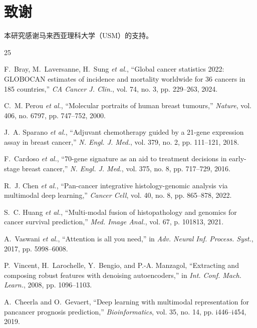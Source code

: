 \documentclass[conference]{IEEEtran}
\begin{document}
\section*{致谢}

本研究感谢马来西亚理科大学（USM）的支持。

\begin{thebibliography}{25}

F.~Bray, M.~Laversanne, H.~Sung \emph{et al.}, ``Global cancer statistics 2022: GLOBOCAN estimates of incidence and mortality worldwide for 36 cancers in 185 countries,'' \emph{CA Cancer J. Clin.}, vol. 74, no. 3, pp. 229--263, 2024.

C.~M. Perou \emph{et al.}, ``Molecular portraits of human breast tumours,'' \emph{Nature}, vol. 406, no. 6797, pp. 747--752, 2000.

J.~A. Sparano \emph{et al.}, ``Adjuvant chemotherapy guided by a 21-gene expression assay in breast cancer,'' \emph{N. Engl. J. Med.}, vol. 379, no. 2, pp. 111--121, 2018.

F.~Cardoso \emph{et al.}, ``70-gene signature as an aid to treatment decisions in early-stage breast cancer,'' \emph{N. Engl. J. Med.}, vol. 375, no. 8, pp. 717--729, 2016.

R.~J. Chen \emph{et al.}, ``Pan-cancer integrative histology-genomic analysis via multimodal deep learning,'' \emph{Cancer Cell}, vol. 40, no. 8, pp. 865--878, 2022.

S.~C. Huang \emph{et al.}, ``Multi-modal fusion of histopathology and genomics for cancer survival prediction,'' \emph{Med. Image Anal.}, vol. 67, p. 101813, 2021.

A.~Vaswani \emph{et al.}, ``Attention is all you need,'' in \emph{Adv. Neural Inf. Process. Syst.}, 2017, pp. 5998--6008.

P.~Vincent, H.~Larochelle, Y.~Bengio, and P.-A. Manzagol, ``Extracting and composing robust features with denoising autoencoders,'' in \emph{Int. Conf. Mach. Learn.}, 2008, pp. 1096--1103.

A.~Cheerla and O.~Gevaert, ``Deep learning with multimodal representation for pancancer prognosis prediction,'' \emph{Bioinformatics}, vol. 35, no. 14, pp. i446--i454, 2019.


\end{thebibliography}
\end{document}
